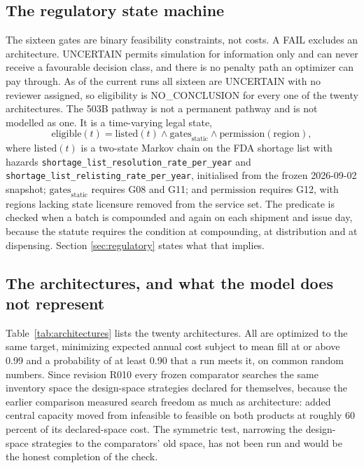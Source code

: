 \subsection{The regulatory state machine}

The sixteen gates are binary feasibility constraints, not costs. A FAIL excludes an
architecture. UNCERTAIN permits simulation for information only and can never receive a
favourable decision class, and there is no penalty path an optimizer can pay through. As of the
current runs all sixteen are UNCERTAIN with no reviewer assigned, so eligibility is
NO\_CONCLUSION for every one of the twenty architectures. The 503B pathway is not a permanent
pathway and is not modelled as one. It is a time-varying legal state,
\begin{equation}
\mathrm{eligible}(t) = \mathrm{listed}(t) \wedge \mathrm{gates}_{\mathrm{static}}
 \wedge \mathrm{permission}(\mathrm{region}) ,
\label{eq:503b}
\end{equation}
where $\mathrm{listed}(t)$ is a two-state Markov chain on the FDA shortage list with hazards
\texttt{shortage\_list\_resolution\_rate\_per\_year} and
\texttt{shortage\_list\_relisting\_rate\_per\_year}, initialised from the frozen 2026-09-02
snapshot; $\mathrm{gates}_{\mathrm{static}}$ requires G08 and G11; and $\mathrm{permission}$
requires G12, with regions lacking state licensure removed from the service set. The predicate
is checked when a batch is compounded and again on each shipment and issue day, because the
statute requires the condition at compounding, at distribution and at dispensing. Section
\ref{sec:regulatory} states what that implies.

\subsection{The architectures, and what the model does not represent}

Table~\ref{tab:architectures} lists the twenty architectures. All are optimized to the same
target, minimizing expected annual cost subject to mean fill at or above 0.99 and a probability
of at least 0.90 that a run meets it, on common random numbers. Since revision R010 every frozen
comparator searches the same inventory space the design-space strategies declared for
themselves, because the earlier comparison measured search freedom as much as architecture:
added central capacity moved from infeasible to feasible on both products at roughly 60 percent
of its declared-space cost. The symmetric test, narrowing the design-space strategies to the
comparators' old space, has not been run and would be the honest completion of the check.

